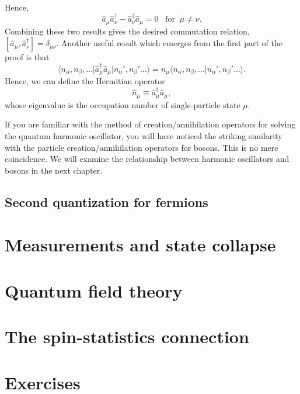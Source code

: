 \documentclass[pra,12pt]{revtex4}
\begin{document}
Hence,
$$\hat{a}_\mu \hat{a}_\nu^\dagger - \hat{a}_\nu^\dagger \hat{a}_\mu = 0 \;\;\;\mathrm{for}\;\;\mu\ne\nu.$$
Combining these two results gives the desired commutation relation,
$[\hat{a}_\mu, \hat{a}_\nu^\dagger] = \delta_{\mu\nu}$.  Another useful result which
emerges from the first part of the proof is that
$$\big\langle n_\alpha, n_\beta, \dots \big| \hat{a}_\mu^\dagger \hat{a}_\mu \big| n_\alpha', n_\beta'\dots\big\rangle = n_\mu \big\langle n_\alpha, n_\beta, \dots \big| n_\alpha', n_\beta'\dots\big\rangle.$$
Hence, we can define the Hermitian operator
$$\hat{n}_\mu \equiv \hat{a}_\mu^\dagger \hat{a}_\mu,$$
whose eigenvalue is the occupation number of single-particle state $\mu$.

If you are familiar with the method of creation/annihilation operators
for solving the quantum harmonic oscillator, you will have noticed the
striking similarity with the particle creation/annihilation operators
for bosons.  This is no mere coincidence.  We will examine the
relationship between harmonic oscillators and bosons in the next
chapter.

\subsection{Second quantization for fermions}



\section{Measurements and state collapse}

\section{Quantum field theory}
\label{sec:qft}

\section{The spin-statistics connection}
\label{sec:spinstats}

\section*{Exercises}
\end{document}
